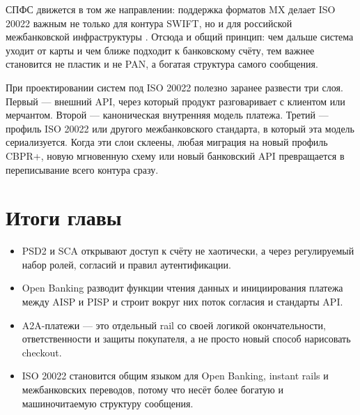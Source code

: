 СПФС движется в том же направлении: поддержка форматов MX делает
ISO 20022 важным не только для контура SWIFT, но и для российской
межбанковской инфраструктуры . Отсюда и общий
принцип: чем дальше система уходит от карты и чем ближе подходит
к банковскому счёту, тем важнее становится не пластик и не PAN,
а богатая структура самого сообщения.

\begin{kaobox}[title=На практике]
  При проектировании систем под ISO 20022 полезно заранее развести
  три слоя. Первый — внешний API, через который продукт разговаривает
  с клиентом или мерчантом. Второй — каноническая внутренняя модель
  платежа. Третий — профиль ISO 20022 или другого межбанковского
  стандарта, в который эта модель сериализуется. Когда эти слои
  склеены, любая миграция на новый профиль CBPR+, новую мгновенную схему
  или новый банковский API превращается в переписывание всего контура
  сразу.
\end{kaobox}

\section*{Итоги главы}

\begin{itemize}
  \item PSD2 и SCA открывают доступ к счёту не хаотически, а через регулируемый набор ролей, согласий и правил аутентификации.
  \item Open Banking разводит функции чтения данных и инициирования платежа между AISP и PISP и строит вокруг них поток
        согласия и стандарты API.
  \item A2A-платежи — это отдельный rail со своей логикой окончательности, ответственности и защиты покупателя, а не просто
        новый способ нарисовать checkout.
  \item ISO 20022 становится общим языком для Open Banking, instant rails и межбанковских переводов, потому что несёт более
        богатую и машиночитаемую структуру сообщения.
\end{itemize}
